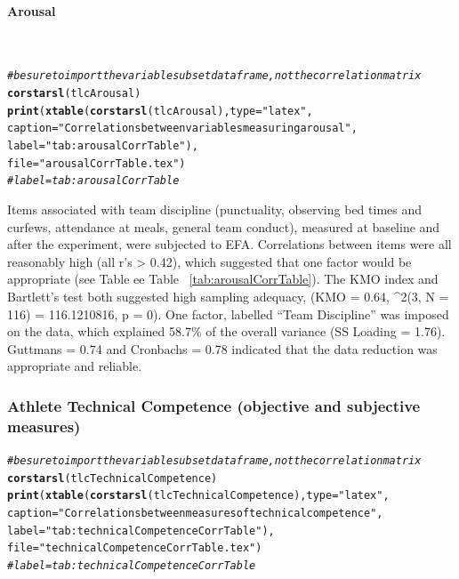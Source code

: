 \documentclass[english]{article}\usepackage[]{graphicx}\usepackage[]{color}
\makeatletter
\newcommand{\hlstr}[1]{\textcolor[rgb]{0.192,0.494,0.8}{#1}}%
\newcommand{\hlcom}[1]{\textcolor[rgb]{0.678,0.584,0.686}{\textit{#1}}}%
\newcommand{\hlstd}[1]{\textcolor[rgb]{0.345,0.345,0.345}{#1}}%
\newcommand{\hlkwc}[1]{\textcolor[rgb]{0.333,0.667,0.333}{#1}}%
\newcommand{\hlkwd}[1]{\textcolor[rgb]{0.737,0.353,0.396}{\textbf{#1}}}%
\newenvironment{kframe}{%
 \def\at@end@of@kframe{}%
 \ifinner\ifhmode%
  \def\at@end@of@kframe{\end{minipage}}%
  \begin{minipage}{\columnwidth}%
 \fi\fi%
 \def\FrameCommand##1{\hskip\@totalleftmargin \hskip-\fboxsep
 \colorbox{shadecolor}{##1}\hskip-\fboxsep
     \hskip-\linewidth \hskip-\@totalleftmargin \hskip\columnwidth}%
 \MakeFramed {\advance\hsize-\width
   \@totalleftmargin\z@ \linewidth\hsize
   \@setminipage}}%
 {\par\unskip\endMakeFramed%
 \at@end@of@kframe}
\newenvironment{knitrout}{}{} %
\newcommand{\myparagraph}[1]{\paragraph{#1}\mbox{}\\}
\makeatother
\begin{document}
\myparagraph{Arousal}




\begin{knitrout}
\color{fgcolor}\begin{kframe}
\begin{alltt}
\hlcom{# be sure to import the variable subset data frame, not the correlation matrix}
\hlkwd{corstarsl}\hlstd{(tlcArousal)}
\hlkwd{print}\hlstd{(}\hlkwd{xtable}\hlstd{(}\hlkwd{corstarsl}\hlstd{(tlcArousal),} \hlkwc{type}\hlstd{=}\hlstr{"latex"}\hlstd{,}
                    \hlkwc{caption} \hlstd{=} \hlstr{"Correlations between variables measuring arousal"}\hlstd{,}
                    \hlkwc{label} \hlstd{=} \hlstr{"tab:arousalCorrTable"}\hlstd{),}
                    \hlkwc{file} \hlstd{=} \hlstr{"arousalCorrTable.tex"}\hlstd{)}
\hlcom{# label = tab:arousalCorrTable}
\end{alltt}
\end{kframe}
\end{knitrout}

Items associated with team discipline (punctuality, observing bed times and curfews, attendance at meals, general team conduct), measured at baseline and after the experiment, were subjected to EFA.  
Correlations between items were all reasonably high (all r's > 0.42), which suggested that one factor would be appropriate (see Table ee Table ~\ref{tab:arousalCorrTable}). The KMO index and Bartlett's test both suggested high sampling adequacy, (KMO =  0.64, \chi^2(3, N = 116) = 116.1210816, p = 0).
One factor, labelled ``Team Discipline'' was imposed on the data, which explained 58.7\% of the overall variance (SS Loading = 1.76).  Guttmans \lambda = 0.74  and  Cronbachs \alpha = 0.78  indicated that the data reduction was appropriate and reliable.



\subsubsection{Athlete Technical Competence (objective and subjective measures)}



\begin{knitrout}
\color{fgcolor}\begin{kframe}
\begin{alltt}
\hlcom{# be sure to import the variable subset data frame, not the correlation matrix}
\hlkwd{corstarsl}\hlstd{(tlcTechnicalCompetence)}
\hlkwd{print}\hlstd{(}\hlkwd{xtable}\hlstd{(}\hlkwd{corstarsl}\hlstd{(tlcTechnicalCompetence),} \hlkwc{type}\hlstd{=}\hlstr{"latex"}\hlstd{,}
                    \hlkwc{caption} \hlstd{=} \hlstr{"Correlations between measures of technical competence"}\hlstd{,}
                    \hlkwc{label} \hlstd{=} \hlstr{"tab:technicalCompetenceCorrTable"}\hlstd{),}
                    \hlkwc{file} \hlstd{=} \hlstr{"technicalCompetenceCorrTable.tex"}\hlstd{)}
\hlcom{# label = tab:technicalCompetenceCorrTable}
\end{alltt}
\end{kframe}
\end{knitrout}
\end{document}
